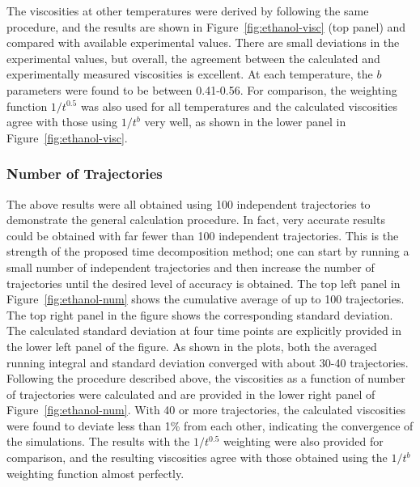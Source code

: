 \documentclass[12pt]{article}
\begin{document}
The viscosities at other temperatures were derived by following the same procedure,
and the results are shown in Figure~\ref{fig:ethanol-visc} (top panel) and compared with available experimental values.
There are small deviations in the experimental values,
but overall,
the agreement between the calculated and experimentally measured viscosities is excellent.
At each temperature,
the $b$ parameters were found to be between 0.41-0.56.
For comparison, the weighting function $1/t^{0.5}$ was also used for all temperatures 
and the calculated viscosities agree with those using $1/t^b$ very well,
as shown in the lower panel in Figure~\ref{fig:ethanol-visc}.

\subsubsection{Number of Trajectories}

The above results were all obtained using 100 independent trajectories to demonstrate the general calculation procedure.
In fact, very accurate results could be obtained with far fewer than 100 independent trajectories. This is the strength of the proposed time decomposition method; one can start by running a small number of independent trajectories and then increase the number of trajectories until the desired level of accuracy is obtained. 
The top left panel in Figure~\ref{fig:ethanol-num} shows the cumulative average of up to 100 trajectories.
The top right panel in the figure shows the corresponding standard deviation.
The calculated standard deviation at four time points are explicitly provided in the lower left panel of the figure.
As shown in the plots,
both the averaged running integral and standard deviation converged with about 30-40 trajectories.
Following the procedure described above,
the viscosities as a function of number of trajectories were calculated 
and are provided in the lower right panel of Figure~\ref{fig:ethanol-num}.
With 40 or more trajectories,
the calculated viscosities were found to deviate less than 1\%  from each other,
indicating the convergence of the simulations.
The results with the $1/t^{0.5}$ weighting were also provided for comparison,
and the resulting viscosities agree with those obtained using the $1/t^b$ weighting function almost perfectly.
\end{document}

